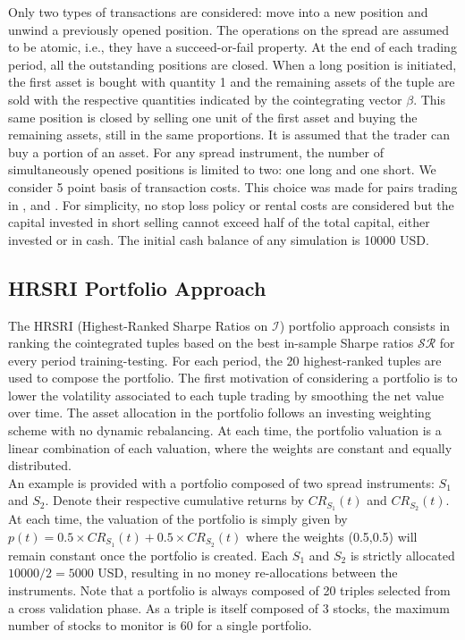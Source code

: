 \documentclass[11pt,a4,twosided,singlespacing,titlepagenumber=on]{scrreprt}
\numberwithin{equation}{chapter} %
\theoremstyle{remark}
\begin{document}
Only two types of transactions are considered: move into a new position and unwind a previously opened position. The operations on the spread are assumed to be atomic, i.e., they have a succeed-or-fail property. At the end of each trading period, all the outstanding positions are closed. When a long position is initiated, the first asset is bought with quantity 1 and the remaining assets of the tuple are sold with the respective quantities indicated by the cointegrating vector $\beta$. This same position is closed by selling one unit of the first asset and buying the remaining assets, still in the same proportions. It is assumed that the trader can buy a portion of an asset. For any spread instrument, the number of simultaneously opened positions is limited to two: one long and one short. We consider 5 point basis of transaction costs. This choice was made for pairs trading in \cite{dunis2010}, \cite{dunis2005} and \cite{alexander2002}. For simplicity, no stop loss policy or rental costs are considered but the capital invested in short selling cannot exceed half of the total capital, either invested or in cash. The initial cash balance of any simulation is 10000 USD.

\subsection{HRSRI Portfolio Approach}

The HRSRI (Highest-Ranked Sharpe Ratios on $\mathcal{I}$) portfolio approach consists in ranking the cointegrated tuples based on the best in-sample Sharpe ratios $\mathcal{SR}$ for every period training-testing. For each period, the 20 highest-ranked tuples are used to compose the portfolio. The first motivation of considering a portfolio is to lower the volatility associated to each tuple trading by smoothing the net value over time. The asset allocation in the portfolio follows an investing weighting scheme with no dynamic rebalancing. At each time, the portfolio valuation is a linear combination of each valuation, where the weights are constant and equally distributed. \\

An example is provided with a portfolio composed of two spread instruments: $S_1$ and $S_2$. Denote their respective cumulative returns by $CR_{S_1}(t)$ and $CR_{S_2}(t)$. At each time, the valuation of the portfolio is simply given by $p(t) = 0.5 \times CR_{S_1}(t) + 0.5 \times CR_{S_2}(t)$ where the weights (0.5,0.5) will remain constant once the portfolio is created. Each $S_1$ and $S_2$ is strictly allocated $10000/2 = 5000$ USD, resulting in no money re-allocations between the instruments. Note that a portfolio is always composed of 20 triples selected from a cross validation phase. As a triple is itself composed of 3 stocks, the maximum number of stocks to monitor is 60 for a single portfolio. 
\end{document}
